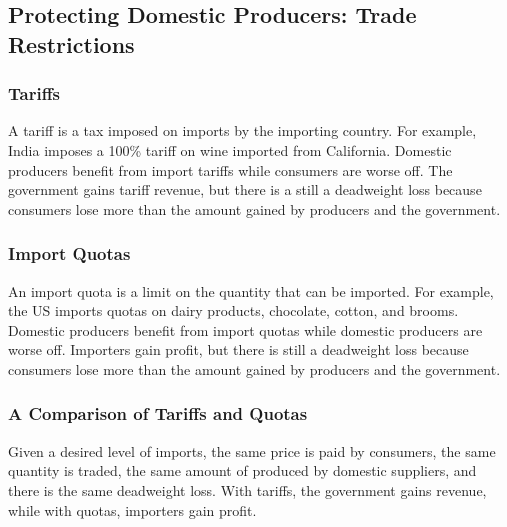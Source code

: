\documentclass[letterpaper, 12pt]{article}
\begin{document}
\subsection{Protecting Domestic Producers: Trade Restrictions}

\subsubsection{Tariffs}
A tariff is a tax imposed on imports by the importing country. For example,
India imposes a 100\% tariff on wine imported from California. Domestic
producers benefit from import tariffs while consumers are worse off. The
government gains tariff revenue, but there is a still a deadweight loss
because consumers lose more than the amount gained by producers and the
government.

\subsubsection{Import Quotas}
An import quota is a limit on the quantity that can be imported. For example,
the US imports quotas on dairy products, chocolate, cotton, and brooms.
Domestic producers benefit from import quotas while domestic producers are
worse off. Importers gain profit, but there is still a deadweight loss because
consumers lose more than the amount gained by producers and the government.

\subsubsection{A Comparison of Tariffs and Quotas}
Given a desired level of imports, the same price is paid by consumers, the same
quantity is traded, the same amount of produced by domestic suppliers, and there
is the same deadweight loss. With tariffs, the government gains revenue, while
with quotas, importers gain profit.
\end{document}
